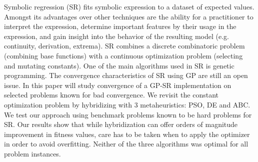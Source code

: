 Symbolic regression (SR) fits symbolic expression to a dataset of expected values. Amongst its advantages over other techniques are the ability for a practitioner to interpret the expression, determine important features by their usage in the expression, and gain insight into the behavior of the resulting model (e.g. continuity, derivation, extrema). SR combines a discrete combinatoric problem (combining base functions) with a continuous optimization problem (selecting and mutating constants). One of the main algorithms used in SR is genetic programming. The convergence characteristics of SR using GP are still an open issue. In this paper will study convergence of a GP-SR implementation on selected problems known for bad convergence. We revisit the constant optimization problem by hybridizing with 3 metaheuristics: PSO, DE and ABC. We test our approach using benchmark problems known to be hard problems for SR.
Our results show that while hybridization can offer orders of magnitude improvement in fitness values, care has to be taken when to apply the optimizer in order to avoid overfitting. Neither of the three algorithms was optimal for all problem instances.